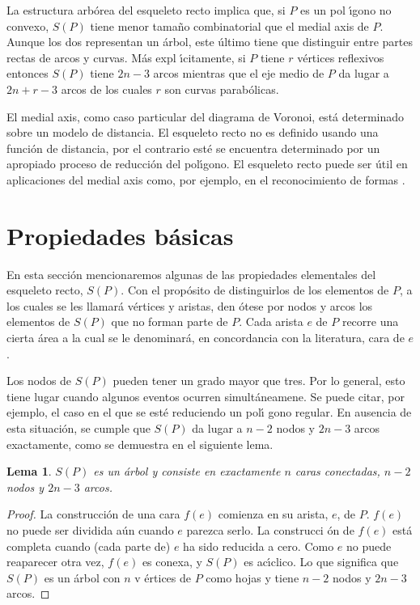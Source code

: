 \documentclass[12pt,english]{report}
\newtheorem{lemma}[theorem]{Lema}
\begin{document}
La estructura arb\'{o}rea del esqueleto recto implica que, si $P$ es un pol%
\'{\i}gono no convexo, $S(P)$ tiene menor tama\~{n}o combinatorial que el
medial axis de $P$. Aunque los dos representan un \'{a}rbol, este \'{u}ltimo
tiene que distinguir entre partes rectas de arcos y curvas. M\'{a}s expl%
\'{\i}citamente, si $P$ tiene $r$ v\'{e}rtices reflexivos entonces $S(P)$
tiene $2n-3$ arcos mientras que el eje medio de $P$ da lugar a $2n+r-3$
arcos de los cuales $r$ son curvas parab\'{o}licas.

El medial axis, como caso particular del diagrama de Voronoi, est\'{a}
determinado sobre un modelo de distancia. El esqueleto recto no es definido
usando una funci\'{o}n de distancia, por el contrario est\'{e} se encuentra
determinado por un apropiado proceso de reducci\'on del pol\'{\i}gono. El
esqueleto recto puede ser \'{u}til en aplicaciones del medial axis como, por
ejemplo, en el reconocimiento de formas \cite{motor}.

\section{Propiedades b\'{a}sicas}

En esta secci\'{o}n mencionaremos algunas de las propiedades elementales del
esqueleto recto, $S(P)$. Con el prop\'{o}sito de distinguirlos de los
elementos de $P$, a los cuales se les llamar\'{a} v\'{e}rtices y aristas, den%
\'{o}tese por nodos y arcos los elementos de $S(P)$ que no forman parte de $%
P $. Cada arista $e$ de $P$ recorre una cierta \'{a}rea a la cual se le
denominar\'{a}, en concordancia con la literatura, cara de $e$.

Los nodos de $S(P)$ pueden tener un grado mayor que tres. Por lo general,
esto tiene lugar cuando algunos eventos ocurren simult\'{a}neamene. Se puede
citar, por ejemplo, el caso en el que se est\'{e} reduciendo un pol\'{\i}%
gono regular. En ausencia de esta situaci\'{o}n, se cumple que $S(P)$ da
lugar a $n-2$ nodos y $2n-3$ arcos exactamente, como se demuestra en el
siguiente lema.

\begin{lemma}
$S(P)$ es un \'{a}rbol y consiste en exactamente $n$ caras conectadas, $n-2$
nodos y $2n-3$ arcos.
\end{lemma}

\begin{proof}
La construcci\'{o}n de una cara $f(e)$ comienza en su arista, $e$, de $P$. $%
f(e)$ no puede ser dividida a\'{u}n cuando $e$ parezca serlo. La construcci%
\'{o}n de $f(e)$ est\'{a} completa cuando (cada parte de) $e$ ha sido
reducida a cero. Como $e$ no puede reaparecer otra vez, $f(e)$ es conexa, y $%
S(P)$ es ac\'{\i}clico. Lo que significa que $S(P)$ es un \'{a}rbol con $n$ v%
\'{e}rtices de $P$ como hojas y tiene $n-2$ nodos y $2n-3$ arcos. 
\end{proof}
\end{document}
